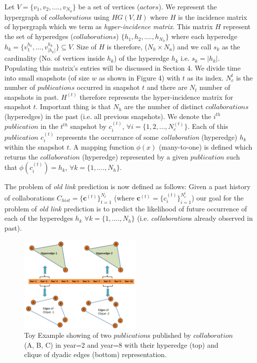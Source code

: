 \documentclass{sig-alternate}
\begin{document}
Let $V = \{v_1,v_2,....,v_{N_a}\}$ be a set of vertices ($actors$). We represent the hypergraph of $collaboration$s using $HG(V,H)$ where $H$ is the incidence matrix of hypergraph which we term as \textit{hyper-incidence matrix}. This matrix \(H\) represent the set of hyperedges ($collaborations$) $\{h_1,h_2,....,h_{N_h}\}$ where each hyperedge $h_{k} = \{ v_{1}^{h_k},..., v_{|h_k|}^{h_k} \} \subseteq V$. Size of $H$ is therefore, ($N_h \times N_a$) and we call $s_k$ as the cardinality (No. of vertices inside $h_k$) of the hyperedge $h_k$ i.e. $s_k = |h_k|$. Populating this matrix's entries will be discussed in Section 4. We divide time into small snapshots (of size $w$ as shown in Figure 4) with $t$ as its index. $N_{c}^{t}$ is the number of $publications$ occurred in snapshot $t$ and there are $N_t$ number of snapshots in past. \(H^{(t)}\) therefore represents the hyper-incidence matrix for snapshot $t$. Important thing is that $N_h$ are the number of distinct $collaborations$ (hyperedges) in the past (i.e. all previous snapshots). We denote the $i^{th}$ $publication$ in the $t^{th}$ snapshot by \(c_{i}^{(t)}\),  \(\forall i = \{1,2,...,N_{c}^{(t)}\}\). Each of this $publication$ $c_i^{(t)}$ represents the occurrance of some \textit{collaboration} (hyperedge) $h_k$ within the snapshot $t$. A mapping function $\phi(x)$ (many-to-one) is defined which returns the $collaboration$ (hyperedge) represented by a given $publication$ such that $\phi(c_i^{(t)})=h_k $, $\forall k=\{1,....,N_h\}$. 

The problem of \textit{old link} prediction is now defined as follows: Given a past history of collaborations $C_{hist}=\{\mathbf{c}^{(t)}\}_{t=1}^{N_t}$ (where $\mathbf{c}^{(t)} = \{c_i^{(t)}\}_{i=1}^{N_c^{t}}$) our goal for the problem of \textit{old link} prediction is to predict the likelihood of future occurrence of each of the hyperedges $h_k$ $\forall k=\{1,....,N_h\}$ (i.e. \textit{collaboration}s already observed in past).

\begin{figure}[h!]
\centering
\includegraphics[width=60mm]{intuition.JPG}
\caption{Toy Example showing of two $publication$s published by $collaboration$ (A, B, C) in year=2 and year=8 with their hyperedge (top) and clique of dyadic edges (bottom) representation.}
\label{overflow}
\vspace{-1.7em}
\end{figure}
\end{document}
